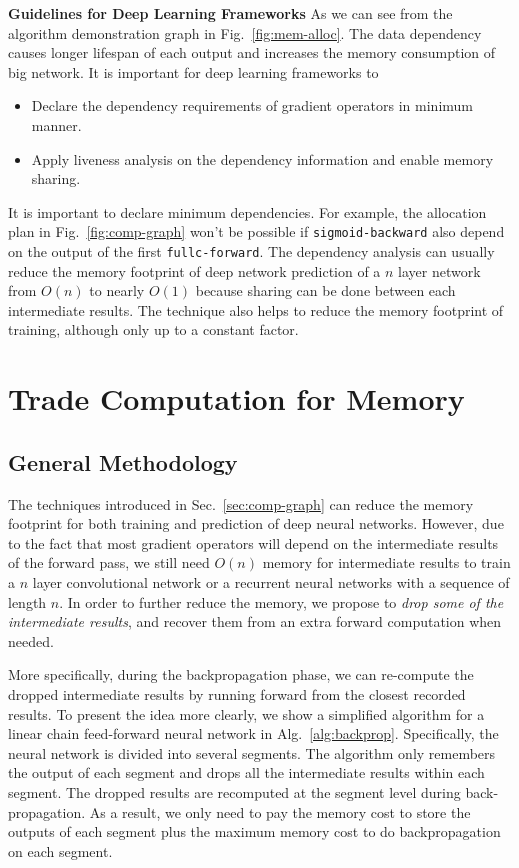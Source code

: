 \documentclass{article} %
\newcommand{\presec}{\vspace*{-2pt}}
\newcommand{\postsec}{\vspace*{-2pt}} %
\begin{document}
\noindent \textbf{Guidelines for Deep Learning Frameworks} As we can see from the algorithm demonstration graph in Fig.~\ref{fig:mem-alloc}.
The data dependency causes longer lifespan of each output and increases the memory consumption of big network.
It is important for deep learning frameworks to
\begin{itemize}
   \item Declare the dependency requirements of gradient operators in minimum manner.
   \item Apply liveness analysis on the dependency information and enable memory sharing.
\end{itemize}

It is important to declare minimum dependencies.
For example, the allocation plan in Fig.~\ref{fig:comp-graph} won't be possible if
\texttt{sigmoid-backward} also depend on the output of the first \texttt{fullc-forward}.
The dependency analysis can usually reduce the memory footprint of deep network prediction of a $n$ layer network from $O(n)$ to nearly $O(1)$ because sharing can be done between each intermediate results.
The technique also helps to reduce the memory footprint of training, although only up to a constant factor.

\presec
\section{Trade Computation for Memory}
\postsec

\subsection{General Methodology}

The techniques introduced in Sec.~\ref{sec:comp-graph} can reduce the memory footprint for both training and prediction of deep neural networks.
However, due to the fact that most gradient operators will depend on the intermediate results
of the forward pass, we still need $O(n)$ memory for intermediate results to train a
$n$ layer convolutional network or a recurrent neural networks with a sequence of length $n$.
In order to further reduce the memory, we propose to \emph{drop some of the intermediate results}, and recover them from an extra forward computation when needed.

More specifically, during the backpropagation phase, we can re-compute the dropped intermediate results by running forward from the closest recorded results.
To present the idea more clearly, we show a simplified algorithm for a linear chain feed-forward neural network in Alg.~\ref{alg:backprop}.
Specifically, the neural network is divided into several segments. The algorithm only remembers the
output of each segment and drops all the intermediate results within each segment. The dropped
results are recomputed at the segment level during back-propagation.
As a result, we only need to pay the memory cost to store the outputs of each segment plus the maximum memory cost to do backpropagation on each segment.
\end{document}

